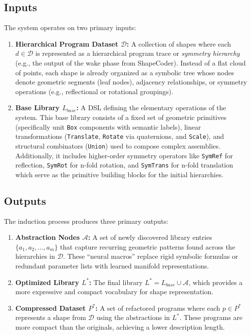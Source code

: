 \documentclass{thesis}
\begin{document}
\subsection{Inputs}
The system operates on two primary inputs:
\begin{enumerate}
    \item \textbf{Hierarchical Program Dataset $\mathcal{D}$:} A collection of shapes where each $d \in \mathcal{D}$ is represented as a hierarchical program trace or \textit{symmetry hierarchy} (e.g., the output of the wake phase from ShapeCoder). Instead of a flat cloud of points, each shape is already organized as a symbolic tree whose nodes denote geometric segments (leaf nodes), adjacency relationships, or symmetry operations (e.g., reflectional or rotational groupings).
    \item \textbf{Base Library $L_{base}$:} A DSL defining the elementary operations of the system. This base library consists of a fixed set of geometric primitives (specifically unit \texttt{Box} components with semantic labels), linear transformations (\texttt{Translate}, \texttt{Rotate} via quaternions, and \texttt{Scale}), and structural combinators (\texttt{Union}) used to compose complex assemblies. Additionally, it includes higher-order symmetry operators like \texttt{SymRef} for reflection, \texttt{SymRot} for n-fold rotation, and \texttt{SymTrans} for n-fold translation which serve as the primitive building blocks for the initial hierarchies.
\end{enumerate}

\subsection{Outputs}
The induction process produces three primary outputs:
\begin{enumerate}
    \item \textbf{Abstraction Nodes $\mathcal{A}$:} A set of newly discovered library entries $\{a_1, a_2, \dots, a_m\}$ that capture recurring geometric patterns found across the hierarchies in $\mathcal{D}$. These ``neural macros'' replace rigid symbolic formulas or redundant parameter lists with learned manifold representations.
    \item \textbf{Optimized Library $L^*$:} The final library $L^* = L_{base} \cup \mathcal{A}$, which provides a more expressive and compact vocabulary for shape representation.
    \item \textbf{Compressed Dataset $P^*$:} A set of refactored programs where each $p \in P^*$ represents a shape from $\mathcal{D}$ using the abstractions in $L^*$. These programs are more compact than the originals, achieving a lower description length.
\end{enumerate}
\end{document}
